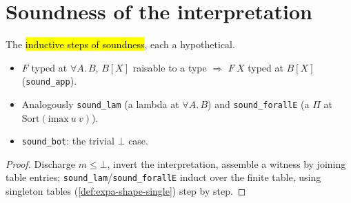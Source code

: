 \section{Soundness of the interpretation}

\begin{theorem}
\label{thm:expa-le-interp-sound-cases}
\leanok
{}

 The \hl{inductive steps of soundness}, each a hypothetical.
\begin{itemize}
\item $F$ typed at $\forall A.\,B$, $B[X]$ raisable to a type $\Rightarrow$ $F\ X$ typed at $B[X]$
(\texttt{sound\_app}).
\item Analogously \texttt{sound\_lam} (a lambda at $\forall A.\,B$) and \texttt{sound\_forallE} (a
$\Pi$ at $\mathrm{Sort}(\mathrm{imax}\ u\ v)$).
\item \texttt{sound\_bot}: the trivial $\bot$ case.
\end{itemize}
\end{theorem}
\begin{proof}
\leanok
{} Discharge $m\le\bot$, invert the interpretation, assemble a witness by joining table
entries; \texttt{sound\_lam}/\texttt{sound\_forallE} induct over the finite table, using singleton
tables (\ref{def:expa-shape-single}) step by step.
\end{proof}

